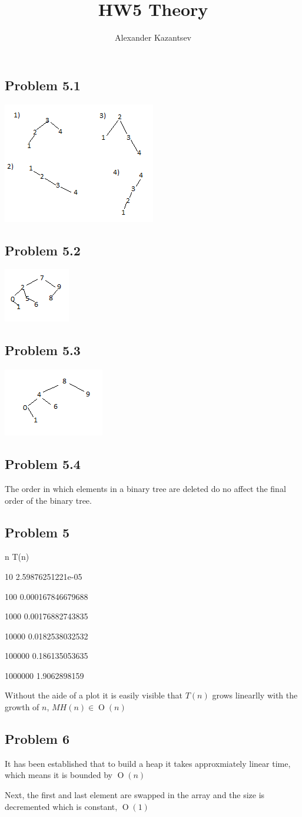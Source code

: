 \documentclass[10pt,letterpaper,oneside]{article}
\title{HW5 Theory}
\author{Alexander Kazantsev}
\newcommand{\Problem}[1]{\subsection*{Problem #1}}
\DeclareMathOperator{\Omicron}{O}
\newcommand{\BigOh}[1]{\Omicron(#1)}
\newcommand\tab[1][1cm]{\hspace*{#1}}
\begin{document}
\maketitle

\Problem{5.1}
\includegraphics{5_1.png}

\Problem{5.2}
\includegraphics{5_2.png}
\Problem{5.3}
\includegraphics{5_3.png}

\Problem{5.4}
The order in which elements in a binary tree are deleted do no affect the final order of the binary tree.

\Problem{5}

n     \tab  T(n)

10     \tab  2.59876251221e-05

100   \tab   0.000167846679688

1000   \tab  0.00176882743835

10000  \tab  0.0182538032532

100000 \tab  0.186135053635

1000000 \tab 1.9062898159

Without the aide of a plot it is easily visible that $T(n)$ grows linearlly with the growth of $n$, $MH(n) \in \BigOh{n}$


\Problem{6}
It has been established that to build a heap it takes approxmiately linear time, which means it is bounded by $\BigOh{n}$

Next, the first and last element are swapped in the array and the size is decremented which is constant, $\BigOh{1}$
\end{document}
